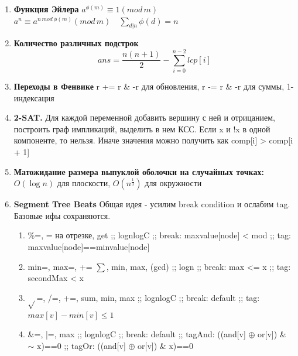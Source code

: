 \begin{enumerate}
    После поглощения (предельное распределение):
    
    Теперь живем внутри поглощающего класса. Если НОД циклов $>1$, класс периодический. В нем НЕТ предельного распределения.
    Иначе: $a_0 P \rightarrow b$.
    
    Как найти b? Решить систему 
    $(I - P)b = 0$ и $\sum_i b_i = 1$ или же просто возвести $P$ в квадрат много раз.

    В пределе внутри $i$ столбца $P^n$ стоит какое-то число $a_i$.

    \item \textbf{Функция Эйлера} $a^{\phi(m)} \equiv 1 (mod \, m)$ \\
    $ a^{n} \equiv a^{n \, mod \, \phi(m)} (mod \, m) \quad \sum_{d|n} \phi(d) = n$

    \item \textbf{Количество различных подстрок}  
    \[
        ans = \frac{n(n+1)}{2} - \sum_{i=0}^{n-2} lcp[i]
    \]

    \item \textbf{Переходы в Фенвике} r += r \& -r для обновления, r -= r \& -r для суммы, 1-индексация
    \item \textbf{2-SAT.} Для каждой переменной добавить вершину с ней и отрицанием, построить граф импликаций, выделить в нем КСС. Если x и !x в одной компоненте, то нельзя. Иначе значения можно получить как comp[i] > comp[i + 1]

    \item \textbf{Матожидание размера выпуклой оболочки на случайных точках:} $O(\log n)$ для плоскости, $O(n^{\frac{1}{3}})$ для окружности
    \item \textbf{Segment Tree Beats} Общая идея - усилим break condition и ослабим tag. Базовые ифы сохраняются.
    \begin{enumerate}
        \item \%=, = на отрезке, get ;; lognlogC ;; break: maxvalue[node] < mod ;; tag: maxvalue[node]==minvalue[node]
        \item min=, max=, += $\sum$, min, max, (gcd) ;; logn ;; break: max <= x ;; tag: secondMax < x
        \item $\sqrt{}$=, /=, +=, sum, min, max ;; lognlogC ;; break: default ;; tag: $max[v] - min[v] \le 1$ 
        \item \&=, |=, max ;; lognlogC ;; break: default ;; tagAnd: ((and[v] $\oplus$ or[v]) \& $\sim$ x)==0 ;; tagOr: ((and[v] $\oplus$ or[v]) \& x)==0
    \end{enumerate}


\end{enumerate}

